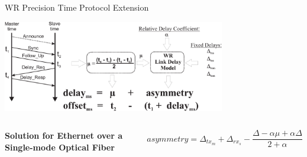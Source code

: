 \documentclass[compress,red]{beamer}
\begin{document}
\begin{frame}{WR Precision Time Protocol Extension}

  \begin{center}
  \includegraphics[height=4cm]{../../figures/protocol/wrLinkModel.pdf}

  \end{center}

  \begin{columns}[c]
  \column{1.5in}

    \begin{center}
      \textbf{Solution for Ethernet over a Single-mode Optical Fiber}
    \end{center}    

  \column{2.7in}

    \begin{equation}
      \nonumber asymmetry = \Delta_{tx_m} + \Delta_{rx_s} - \frac{\Delta - \alpha \mu + \alpha \Delta}{2 + \alpha}
    \end{equation}

  \end{columns}

\end{frame}
\end{document}
